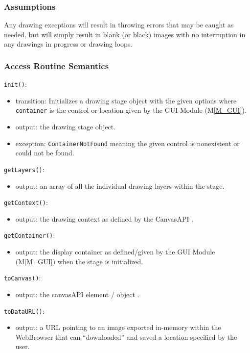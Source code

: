 \documentclass[12pt, titlepage]{article}
\newcommand{\mref}[1]{M\ref{#1}}
\newcommand{\mrefp}[1]{(\mref{#1})}
\newcommand{\mreff}[1]{Module \mrefp{#1}}
\newcommand{\code}[1]{\texttt{#1}}
\begin{document}
\subsubsection{Assumptions}
Any drawing exceptions will result in throwing errors that may be caught as needed,
but will simply result in blank (or black) images with no interruption in any
drawings in progress or drawing loops.

\subsubsection{Access Routine Semantics}

\noindent \code{init()}:
\begin{itemize}
\item transition: Initializes a drawing stage object with the given options where \code{container}
  is the control or location given by the GUI \mreff{M_GUI}.
\item output: the drawing stage object.
\item exception: \code{ContainerNotFound} meaning the given control is nonexistent or could not be found.
\end{itemize}

\noindent \code{getLayers()}:
\begin{itemize}
\item output: an array of all the individual drawing layers within the stage.
\end{itemize}

\noindent \code{getContext()}:
\begin{itemize}
\item output: the drawing context as defined by the CanvasAPI \cite{html_std_canvas}.
\end{itemize}

\noindent \code{getContainer()}:
\begin{itemize}
\item output: the display container as defined/given by the GUI \mreff{M_GUI} when the stage is initialized.
\end{itemize}

\noindent \code{toCanvas()}:
\begin{itemize}
\item output: the canvasAPI element / object \cite{html_std_canvas}.
\end{itemize}

\noindent \code{toDataURL()}:
\begin{itemize}
\item output: a URL pointing to an image exported in-memory within the WebBrowser that can
  ``downloaded'' and saved a location specified by the user.
\end{itemize}
\end{document}
